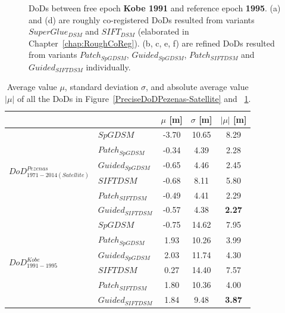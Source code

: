 \begin{figure}[htbp]
\begin{center}
		\caption{{\ac{DoD}s between free epoch \textbf{Kobe 1991} and reference epoch \textbf{1995}. (a) and (d) are roughly co-registered \ac{DoD}s resulted from variants $SuperGlue_{DSM}$ and $SIFT_{DSM}$ (elaborated in Chapter~\ref{chap:RoughCoReg}). (b, c, e, f) are refined \ac{DoD}s resulted from variants $Patch_{SpGDSM}$, $Guided_{SpGDSM}$, $Patch_{SIFTDSM}$ and $Guided_{SIFTDSM}$ individually.}}
		\label{PreciseDoDKobe}
	\end{center}
\end{figure} 



\begin{table}%
	\footnotesize
	\centering
	\begin{tabular}{||l|l|c|c|c||}\hline
		& &$\mu$ [m]&$\sigma$ [m]&$|\mu|$ [m]\\\hline\hline
		\multirow{6}{*}{$DoD^{Pezenas}_{1971-2014(Satellite)}$}
		&${{SpGDSM}}$ & -3.70 & 10.65 & 8.29\\
		&${Patch_{SpGDSM}}$ & -0.34 & 4.39 & 2.28\\
		&${Guided_{SpGDSM}}$ & -0.65 & 4.46 & 2.45\\
		&${{SIFTDSM}}$ & -0.68 & 8.11 & 5.80\\
		&${Patch_{SIFTDSM}}$ & -0.49 & 4.41 & 2.29\\
		&${Guided_{SIFTDSM}}$ & -0.57 & 4.38 & \textbf{2.27}\\\hline
		
		\multirow{6}{*}{$DoD^{Kobe}_{1991-1995}$}
		&${{SpGDSM}}$ & -0.75 & 14.62 & 7.95\\
		&${Patch_{SpGDSM}}$ & 1.93 & 10.26 & 3.99\\
		&${Guided_{SpGDSM}}$ & 2.03 & 11.74 & 4.30\\
		&${{SIFTDSM}}$ & 0.27 & 14.40 & 7.57\\
		&${Patch_{SIFTDSM}}$ & 1.80 & 10.36 & 4.00\\
		&${Guided_{SIFTDSM}}$ & 1.84 & 9.48 & \textbf{3.87}\\\hline
				
	\end{tabular}
	\caption{Average value $\mu$, standard deviation $\sigma$, and absolute average value $|\mu|$ of all the \ac{DoD}s in Figure~\ref{PreciseDoDPezenas-Satellite} and ~\ref{PreciseDoDKobe}.}
	\label{PreciseDoDStatistic1}
\end{table}


